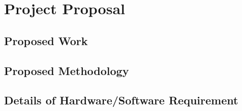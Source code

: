  \chapter{Project Proposal}
 \hspace{0.26in}
 
\section{Proposed Work}
\hspace{0.26in}

\section{Proposed Methodology}
\hspace{0.26in}

\section{Details of Hardware/Software Requirement}
\hspace{0.26in}





